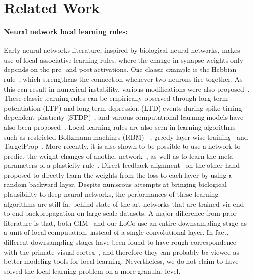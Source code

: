 \section{Related Work}
\label{sec:related}

\paragraph{Neural network local learning rules:} Early neural networks literature, inspired by
biological neural networks, makes use of local associative learning rules, where the change in
synapse weights only depends on the pre- and post-activations. One classic example is the Hebbian
rule~\cite{hebb}, which strengthens the connection whenever two neurons fire together. As this can
result in numerical instability, various modifications were also proposed~\cite{oja,bcm}. These
classic learning rules can be empirically observed through long-term potentiation (LTP) and long
term depression (LTD) events during spike-timing-dependent plasticity
(STDP)~\cite{stdp,caporale2008spike}, and various computational learning models have also been
proposed~\cite{ystdp}. Local learning rules are also seen in learning algorithms such as restricted
Boltzmann machines (RBM) ~\cite{bm,hinton2012practical,dbn}, greedy layer-wise
training~\cite{greedypretrain,belilovsky2018greedy} and TargetProp~\cite{targetprop}. More recently,
it is also shown to be possible to use a network to predict the weight changes of another
network~\cite{synthetic,metaunsup,learn2remember}, as well as to learn the meta-parameters of a
plasticity rule~\cite{diffplasticity,backpropamine}. Direct feedback alignment~\cite{dfa} on the
other hand proposed to directly learn the weights from the loss to each layer by using a random
backward layer. Despite numerous attempts at bringing biological plausibility to deep neural 
networks, the performances of these learning algorithms are still far behind state-of-the-art 
networks that are trained via end-to-end backpropagation on large scale datasets. A major difference
from prior literature is that, both GIM~\cite{e2e2e} and our LoCo use an entire downsampling stage
as a unit of local computation, instead of a single convolutional layer. In fact, different
downsampling stages have been found to have rough correspondence with the primate visual
cortex~\cite{brainscore,contrastivebrain}, and therefore they can probably be viewed as better
modeling tools for local learning. Nevertheless, we do not claim to have solved the local learning
problem on a more granular level.


